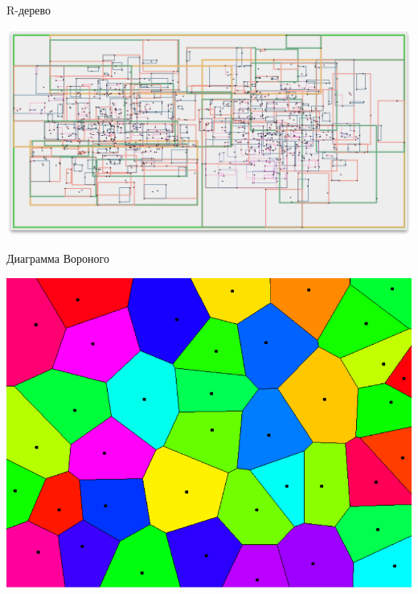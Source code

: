 \documentclass[14pt, fleqn, xcolor={dvipsnames, table}]{beamer}
\begin{document}
        \begin{frame}{R-дерево}
            \begin{center}
	            \includegraphics[scale = 0.25]{r-tree.png}
	        \end{center}  
        \end{frame}
        
        \begin{frame}{Диаграмма Вороного}
            \begin{center}
	            \includegraphics[scale = 0.33]{voronoi-1.png}
	        \end{center}       
        \end{frame}
        
\end{document}
